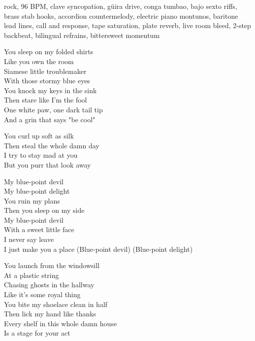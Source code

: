

\begin{notes}
\end{notes}
\begin{style}
rock, 96 BPM, clave syncopation, güira drive, conga tumbao, bajo sexto riffs, brass stab hooks, accordion countermelody, electric piano montunos, baritone lead lines, call and response, tape saturation, plate reverb, live room bleed, 2-step backbeat, bilingual refrains, bittersweet momentum
\end{style}
\begin{lyrics}
You sleep on my folded shirts\\
Like you own the room\\
Siamese little troublemaker\\
With those stormy blue eyes\\
You knock my keys in the sink\\
Then stare like I'm the fool\\
One white paw, one dark tail tip\\
And a grin that says "be cool"

You curl up soft as silk\\
Then steal the whole damn day\\
I try to stay mad at you\\
But you purr that look away

My blue-point devil\\
My blue-point delight\\
You ruin my plans\\
Then you sleep on my side\\
My blue-point devil\\
With a sweet little face\\
I never say leave\\
I just make you a place
(Blue-point devil)
(Blue-point delight)

You launch from the windowsill\\
At a plastic string\\
Chasing ghosts in the hallway\\
Like it's some royal thing\\
You bite my shoelace clean in half\\
Then lick my hand like thanks\\
Every shelf in this whole damn house\\
Is a stage for your act


\end{lyrics}
